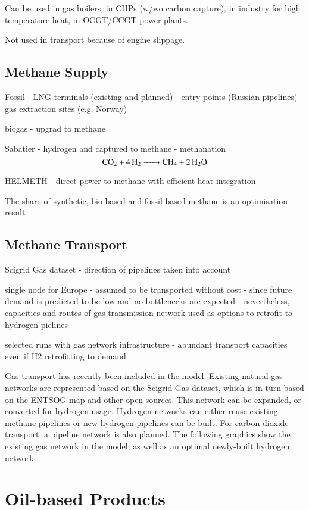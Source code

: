 Can be used in gas boilers, in CHPs (w/wo carbon capture), in industry for high temperature heat, in OCGT/CCGT power plants.

Not used in transport because of engine slippage.

\subsection{Methane Supply}

Fossil
- LNG terminals (existing and planned)
- entry-points (Russian pipelines)
- gas extraction sites (e.g. Norway)

biogas
- upgrad to methane

Sabatier
- hydrogen and captured \co{} to methane
- methanation
\begin{equation}
    \ce{CO2 + 4H2 -> CH4 + 2H2O}
\end{equation}

HELMETH
- direct power to methane with efficient heat integration

The share of synthetic, bio-based and fossil-based methane is an optimisation result

\subsection{Methane Transport}

Scigrid Gas dataset
- direction of pipelines taken into account

single node for Europe
- assumed to be transported without cost
- since future demand is predicted to be low and no bottlenecks are expected
- nevertheless, capacities and routes of gas transmission network used as options to retrofit to hydrogen pielines

selected runs with gas network infrastructure
- abundant transport capacities even if H2 retrofitting to demand

Gas transport has recently been included in the model. Existing natural gas
networks are represented based on the Scigrid-Gas dataset, which is in turn
based on the ENTSOG map and other open sources. This network can be expanded, or
converted for hydrogen usage. Hydrogen networks can either reuse existing
methane pipelines or new hydrogen pipelines can be built. For carbon dioxide
transport, a pipeline network is also planned. The following graphics show the
existing gas network in the model, as well as an optimal newly-built hydrogen
network.

\section{Oil-based Products}

